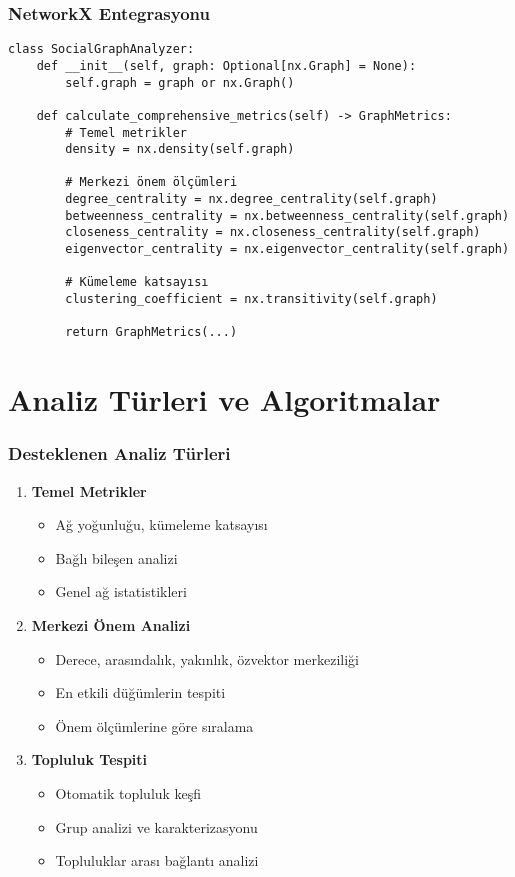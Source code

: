 \documentclass[aspectratio=169]{beamer}
\begin{document}
\begin{frame}[fragile]
\frametitle{NetworkX Entegrasyonu}
\begin{lstlisting}[caption=Sosyal Ağ Analiz Araçları]
class SocialGraphAnalyzer:
    def __init__(self, graph: Optional[nx.Graph] = None):
        self.graph = graph or nx.Graph()
    
    def calculate_comprehensive_metrics(self) -> GraphMetrics:
        # Temel metrikler
        density = nx.density(self.graph)
        
        # Merkezi önem ölçümleri
        degree_centrality = nx.degree_centrality(self.graph)
        betweenness_centrality = nx.betweenness_centrality(self.graph)
        closeness_centrality = nx.closeness_centrality(self.graph)
        eigenvector_centrality = nx.eigenvector_centrality(self.graph)
        
        # Kümeleme katsayısı
        clustering_coefficient = nx.transitivity(self.graph)
        
        return GraphMetrics(...)
\end{lstlisting}
\end{frame}

\section{Analiz Türleri ve Algoritmalar}

\begin{frame}
\frametitle{Desteklenen Analiz Türleri}
\begin{enumerate}
    \item \textbf{Temel Metrikler}
    \begin{itemize}
        \item Ağ yoğunluğu, kümeleme katsayısı
        \item Bağlı bileşen analizi
        \item Genel ağ istatistikleri
    \end{itemize}
    
    \item \textbf{Merkezi Önem Analizi}
    \begin{itemize}
        \item Derece, arasındalık, yakınlık, özvektor merkeziliği
        \item En etkili düğümlerin tespiti
        \item Önem ölçümlerine göre sıralama
    \end{itemize}
    
    \item \textbf{Topluluk Tespiti}
    \begin{itemize}
        \item Otomatik topluluk keşfi
        \item Grup analizi ve karakterizasyonu
        \item Topluluklar arası bağlantı analizi
    \end{itemize}
\end{enumerate}
\end{frame}
\end{document}
